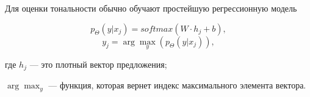 Для оценки тональности обычно обучают простейшую регрессионную модель

\begin{equation}
  p_{\Theta}(y|x_j) = softmax(W\cdot{h_j} + b),
\end{equation}
\begin{equation}
  y_j = \arg \max_y(p_{\Theta}(y|x_j)),
\end{equation}
\begin{explanationx}
\item[где] $h_j$ --- это плотный вектор предложения;
\item$\arg \max_y$ --- функция, которая вернет индекс максимального элемента вектора.
\end{explanationx}